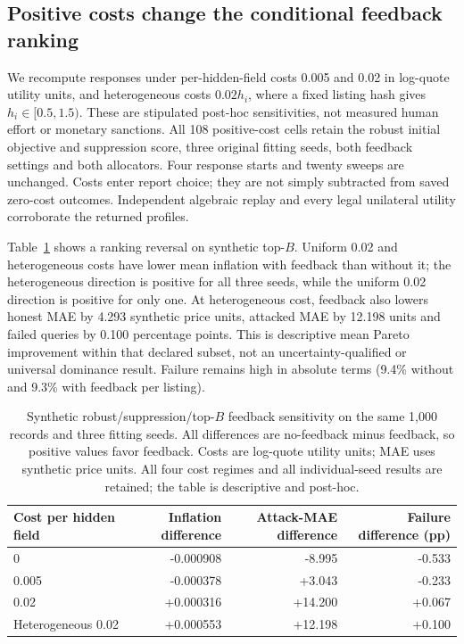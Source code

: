 \documentclass[11pt]{article}
\begin{document}
\subsection{Positive costs change the conditional feedback ranking}
We recompute responses under per-hidden-field costs 0.005 and 0.02 in log-quote
utility units, and heterogeneous costs $0.02h_i$, where a fixed listing hash
gives $h_i\in[0.5,1.5)$. These are stipulated post-hoc sensitivities, not measured
human effort or monetary sanctions. All 108 positive-cost cells retain the
robust initial objective and suppression score, three original fitting seeds,
both feedback settings and both allocators. Four response starts and twenty
sweeps are unchanged. Costs enter report choice; they are not simply subtracted
from saved zero-cost outcomes. Independent algebraic replay and every legal
unilateral utility corroborate the returned profiles.

Table~\ref{tab:cost_sensitivity} shows a ranking reversal on synthetic top-$B$.
Uniform 0.02 and heterogeneous costs have lower mean inflation with feedback
than without it; the heterogeneous direction is positive for all three seeds,
while the uniform 0.02 direction is positive for only one. At heterogeneous
cost, feedback also lowers honest MAE by 4.293 synthetic price units, attacked
MAE by 12.198 units and failed queries by 0.100 percentage points. This is
descriptive mean Pareto improvement within that declared subset, not an
uncertainty-qualified or universal dominance result. Failure remains high
in absolute terms (9.4\% without and 9.3\% with feedback per listing).

\begin{table}[htbp]\centering\small
\begin{tabular}{lrrr}\toprule
Cost per hidden field & Inflation difference & Attack-MAE difference & Failure difference (pp)\\\midrule
0 & -0.000908 & -8.995 & -0.533 \\
0.005 & -0.000378 & +3.043 & -0.233 \\
0.02 & +0.000316 & +14.200 & +0.067 \\
Heterogeneous 0.02 & +0.000553 & +12.198 & +0.100 \\
\bottomrule\end{tabular}
\caption{Synthetic robust/suppression/top-$B$ feedback sensitivity on the same
1,000 records and three fitting seeds. All differences are no-feedback minus
feedback, so positive values favor feedback. Costs are log-quote utility units;
MAE uses synthetic price units. All four cost regimes and all individual-seed
results are retained; the table is descriptive and post-hoc.}
\label{tab:cost_sensitivity}\end{table}
\end{document}
